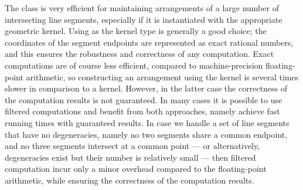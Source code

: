 The  class is very efficient for
maintaining arrangements of a large number of intersecting line segments,
especially if it is instantiated with the appropriate geometric kernel.
Using  as the kernel type is generally a good choice;
the coordinates of the segment endpoints are represented as exact rational
numbers, and this ensures the robustness and correctness of any computation.
Exact computations are of course less efficient, compared to machine-precision
floating-point arithmetic, so constructing an arrangement using the
 kernel is several times slower in comparison to
a  kernel. However, in the latter case the
correctness of the computation results is not guaranteed.
In many cases it is possible to use filtered computations and benefit from
both approaches, namely achieve fast running times with guaranteed results.
In case we handle a set of line segments that have no degeneracies, namely
no two segments share a common endpoint, and no three segments intersect at
a common point --- or alternatively, degeneracies exist but their number is
relatively small --- then filtered computation incur only a minor overhead
compared to the floating-point arithmetic, while ensuring the correctness of
the computation results.

